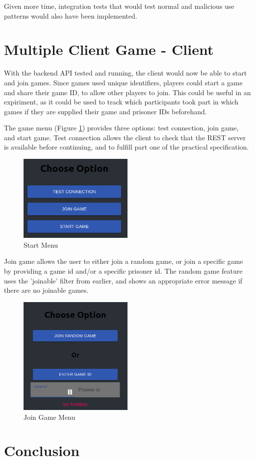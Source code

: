 \documentclass[12pt]{article}
\begin{document}
Given more time, integration tests that would test normal and malicious use patterns would also have been implemented. 

\part{Multiple Client Game - Client}

With the backend API tested and running, the client would now be able to start and join games. Since games used unique identifiers, players could start a game and share their game ID, to allow other players to join. This could be useful in an expiriment, as it could be used to track which participants took part in which games if they are supplied their game and prisoner IDs beforehand. 

The game menu (Figure \ref{fig:startmenu}) provides three options: test connection, join game, and start game. Test connection allows the client to check that the REST server is available before continuing, and to fulfill part one of the practical specification. 

\begin{figure}[!ht]
        \centering
        \includegraphics[width=0.5\textwidth]{images/menu} %
        \caption{Start Menu}
        \label{fig:startmenu}
\end{figure}

Join game allows the user to either join a random game, or join a specific game by providing a game id and/or a specific prisoner id. The random game feature uses the 'joinable' filter from earlier, and shows an appropriate error message if there are no joinable games. 

\begin{figure}[!ht]
        \centering
        \includegraphics[width=0.5\textwidth]{images/joingame} %
        \caption{Join Game Menu}
        \label{fig:joingame}
\end{figure}



\part*{Conclusion}



\end{document}
